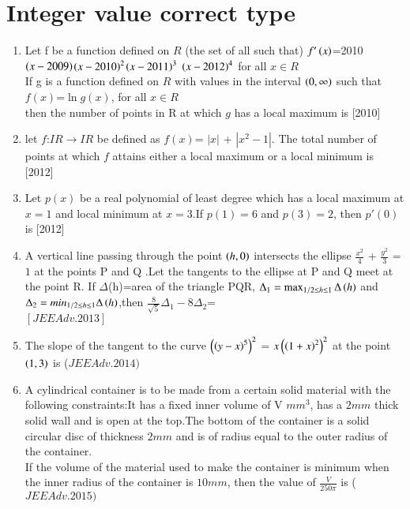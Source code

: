 \documentclass[journal,12pt,twocolumn]{IEEEtran}
\theoremstyle{remark}
\begin{document}
																					  \section{Integer value correct type}
																					  \begin{enumerate}
																					  \item Let f be a function defined on $R$ (the set of all such that) $f'\left(x\right)$=2010$\left(x-2009\right)$$\left(x-2010\right)^2$$\left(x-2011\right)^3$ $\left(x-2012\right)^4$ for all $x \in R$ \\ If g is a function defined on $R$ with values in the interval $\left(0,\infty\right)$ such that \\
																					    $f(x)$=$\ln{g(x)}$, for all $x\in R$\\ then the number of points in R at which $g$ has a local maximum is \hfill [2010]\\
																					    \item let $f$:$IR \rightarrow IR$ be defined as $f(x)$= $|x|$ + $|x^2-1|$. The total number of points at which $f$ attains either a local maximum or a local minimum is\\ \hfill [2012] \\
																					    \item Let $p(x)$ be a real polynomial of least degree which has a local maximum at $x=1$ and local minimum at $x=3$.If $p(1)=6$ and $p(3)=2$, then $p'(0)$ is \hfill [2012] \\
																					    \item A vertical line passing through the point $\left(h,0\right)$ intersects the ellipse $\frac{x^2}{4}$ + $\frac{y^2}{3}$ = $1$ at the points P and Q .Let the tangents to the ellipse at P and Q meet at the point R. If $\Delta$(h)=area of the triangle PQR, $\Delta_1  = \max _{1/2\leq h \leq 1}\Delta\left(h\right)$ and $\Delta_2 = min_{1/2\leq h \leq 1}\Delta\left(h\right)$,then $\frac{8}{\sqrt{5}}\Delta_1 - 8\Delta_2$=\\\hfill $[JEEAdv.2013]$\\
																					    \item The slope of the tangent to the curve $\left(\left(y-x\right)^5\right)^2$ = $x\left(\left(1+x\right)^2\right)^2$ at the point $\left(1,3\right)$ is \hfill ($JEE Adv. 2014)$ \\
																					    \item A cylindrical container is to be made from a certain solid material with the following constraints:It has a fixed inner volume of V $mm^3$, has a $2mm$ thick solid wall and is open at the top.The bottom of the container is a solid circular disc of thickness $2mm$ and is of radius equal to the outer radius of the container.\\If the volume of the material used to make the container is minimum when the inner radius of the container is $10mm$, then the value of $\frac{V}{250\pi}$ is \hfill ($JEE Adv. 2015)$ \\  
																					    \end{enumerate}
																					    
\end{document}

